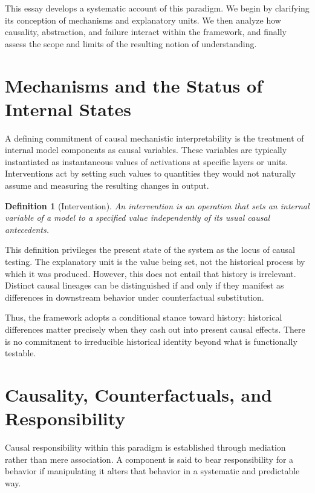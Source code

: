 \documentclass[11pt]{article}
\newtheorem{definition}{Definition}
\begin{document}
This essay develops a systematic account of this paradigm. We begin by clarifying its conception of mechanisms and explanatory units. We then analyze how causality, abstraction, and failure interact within the framework, and finally assess the scope and limits of the resulting notion of understanding.

\section{Mechanisms and the Status of Internal States}

A defining commitment of causal mechanistic interpretability is the treatment of internal model components as causal variables. These variables are typically instantiated as instantaneous values of activations at specific layers or units. Interventions act by setting such values to quantities they would not naturally assume and measuring the resulting changes in output.

\begin{definition}[Intervention]
An intervention is an operation that sets an internal variable of a model to a specified value independently of its usual causal antecedents.
\end{definition}

This definition privileges the present state of the system as the locus of causal testing. The explanatory unit is the value being set, not the historical process by which it was produced. However, this does not entail that history is irrelevant. Distinct causal lineages can be distinguished if and only if they manifest as differences in downstream behavior under counterfactual substitution.

Thus, the framework adopts a conditional stance toward history: historical differences matter precisely when they cash out into present causal effects. There is no commitment to irreducible historical identity beyond what is functionally testable.

\section{Causality, Counterfactuals, and Responsibility}

Causal responsibility within this paradigm is established through mediation rather than mere association. A component is said to bear responsibility for a behavior if manipulating it alters that behavior in a systematic and predictable way.
\end{document}
